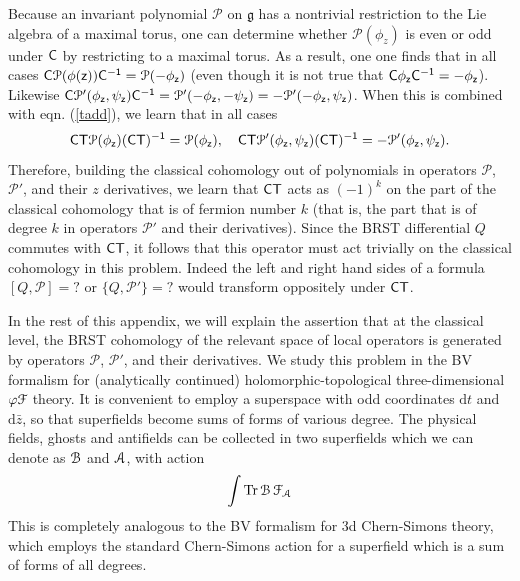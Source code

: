 \documentclass[11pt,a4paper]{article}
\begin{document}
 Because an invariant polynomial $\mathcal P$ on $\mathfrak g$ has a nontrivial restriction to the Lie algebra of a maximal torus, 
one can determine whether $\mathcal P(\phi_z)$ is even or odd under $\sf C$ by restricting to a maximal torus.   As a result, one 
 one finds that
 in all cases $\sf C \mathcal P(\phi(z)) \sf C^{-1}=\mathcal P(-\phi_z)$  (even though it is not true that $\sf C \phi_z\sf C^{-1}=-\phi_z$).    Likewise
 $\sf C\mathcal P'(\phi_z,\psi_z)\sf C^{-1} =\mathcal P'(-\phi_z,-\psi_z)=-\mathcal P'(-\phi_z,\psi_z)$.    When this is combined with eqn. (\ref{tadd}),
 we learn that in all cases 
 \begin{equation}\label{wadd} \sf C\sf T \mathcal P(\phi_z)(\sf C\sf T)^{-1}=\mathcal P(\phi_z),~~~
  \sf C\sf T \mathcal P'(\phi_z,\psi_z)(\sf C\sf T)^{-1}=-\mathcal P'(\phi_z,\psi_z). \end{equation}
  Therefore, building the classical cohomology out of polynomials in operators $\mathcal P$, $\mathcal P'$, and their $z$ derivatives, we learn that $\sf C\sf T$
  acts as $(-1)^k$ on the part of the classical cohomology that is of fermion number $k$ (that is, the part that is of degree $k$ in operators $\mathcal P'$ and their
  derivatives).   Since the BRST differential $Q$ commutes with $\sf C\sf T$, it follows that this operator must act trivially on the classical
  cohomology in this problem. Indeed the left and right hand sides 
 of a formula $[Q,\mathcal P]=?$ or $\{Q,\mathcal P'\}=?$ would transform oppositely under $\sf C\sf T$.
 
 In the rest of this appendix, we will explain the assertion that at the classical level, the BRST  cohomology of the relevant space of local operators
 is generated by operators $\mathcal P$, $\mathcal P'$, and their derivatives.
We study this problem in the BV formalism for (analytically continued) holomorphic-topological three-dimensional $\varphi {\cal F}$ theory. 
It is convenient to employ a superspace with odd coordinates ${\mathrm d} t$ and ${\mathrm d} \bar z$, so that superfields become sums of forms of various degree. 
The physical fields, ghosts and antifields can be collected in two superfields which we can denote as ${\cal B}$ and ${\cal A}$, with action
\begin{equation}
\int \mathrm{Tr} \,{\cal B} \,{\cal F}_{\cal A}
\end{equation}
This is completely analogous to the BV formalism for 3d Chern-Simons theory, which employs the standard Chern-Simons action for a superfield 
which is a sum of forms of all degrees. 
\end{document}

